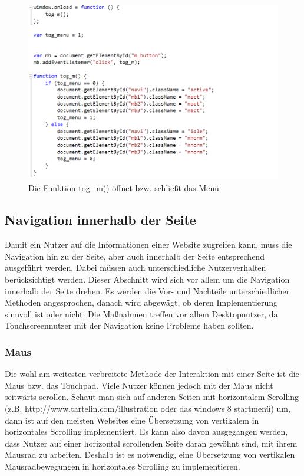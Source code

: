 \begin{figure} [h]
\includegraphics[width=\textwidth]{./img/js_menuevent.png}
\caption{Die Funktion tog\_m() öffnet bzw. schließt das Menü}
\label{js_menuevent}
\end{figure}

\subsection{Navigation innerhalb der Seite}
Damit ein Nutzer auf die Informationen einer Website zugreifen kann, muss die Navigation hin zu der Seite, aber auch innerhalb der Seite entsprechend ausgeführt werden. Dabei müssen auch unterschiedliche Nutzerverhalten berücksichtigt werden. Dieser Abschnitt wird sich vor allem um die Navigation innerhalb der Seite drehen. Es werden die Vor- und Nachteile unterschiedlicher Methoden angesprochen, danach wird abgewägt, ob deren Implementierung sinnvoll ist oder nicht.
Die Maßnahmen treffen vor allem Desktopnutzer, da Touchscreennutzer mit der Navigation keine Probleme haben sollten.
\subsubsection{Maus}
Die wohl am weitesten verbreitete Methode der Interaktion mit einer Seite ist die Maus bzw. das Touchpad. Viele Nutzer können jedoch mit der Maus nicht seitwärts scrollen. Schaut man sich auf anderen Seiten mit horizontalem Scrolling (z.B.
	{http://www.tartelin.com/illustration} oder das windows 8 startmenü) um, dann ist auf den meisten Websites eine Übersetzung von vertikalem in horizontales Scrolling implementiert. Es kann also davon ausgegangen werden, dass Nutzer auf einer horizontal scrollenden Seite daran gewöhnt sind, mit ihrem Mausrad zu arbeiten. Deshalb ist es notwendig, eine Übersetzung von vertikalen Mausradbewegungen in horizontales Scrolling zu implementieren. 
	
